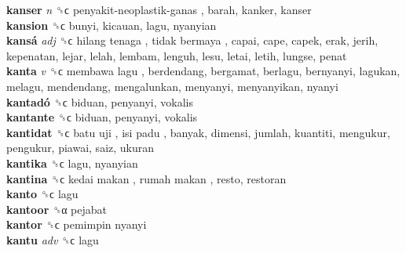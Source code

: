 \textbf{kanser} \emph{n}  ␝ϲ   penyakit-neoplastik-ganas , barah, kanker, kanser  \\
\textbf{kansion} ␝ϲ  bunyi, kicauan, lagu, nyanyian  \\
\textbf{kansá} \emph{adj}  ␝ϲ   hilang tenaga ,  tidak bermaya , capai, cape, capek, erak, jerih, kepenatan, lejar, lelah, lembam, lenguh, lesu, letai, letih, lungse, penat  \\
\textbf{kanta} \emph{v}  ␝ϲ   membawa lagu , berdendang, bergamat, berlagu, bernyanyi, lagukan, melagu, mendendang, mengalunkan, menyanyi, menyanyikan, nyanyi  \\
\textbf{kantadó} ␝ϲ  biduan, penyanyi, vokalis  \\
\textbf{kantante} ␝ϲ  biduan, penyanyi, vokalis  \\
\textbf{kantidat} ␝ϲ   batu uji ,  isi padu , banyak, dimensi, jumlah, kuantiti, mengukur, pengukur, piawai, saiz, ukuran  \\
\textbf{kantika} ␝ϲ  lagu, nyanyian  \\
\textbf{kantina} ␝ϲ   kedai makan ,  rumah makan , resto, restoran  \\
\textbf{kanto} ␝ϲ  lagu  \\
\textbf{kantoor} ␝α  pejabat  \\
\textbf{kantor} ␝ϲ   pemimpin nyanyi   \\
\textbf{kantu} \emph{adv}  ␝ϲ  lagu  \\
